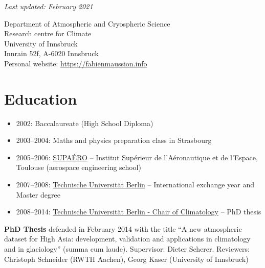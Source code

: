 \textit{Last updated: February 2021}

Department of Atmospheric and Cryospheric Science \\
Research centre for Climate \\
University of Innsbruck \\
Innrain 52f, A-6020 Innsbruck \\
Personal website: \href{https://fabienmaussion.info}{https://fabienmaussion.info}


\section*{Education}
\label{\detokenize{ch08/cv:education}}\begin{itemize}[nosep]
\item {} 
2002: Baccalaureate (High School Diploma)

\item {} 
2003--2004: Maths and physics preparation class in Strasbourg

\item {} 
2005--2006: \href{https://www.isae-supaero.fr/en/}{SUPAÉRO} -- Institut Supérieur de l’Aéronautique et de l’Espace, Toulouse (aerospace engineering school)

\item {} 
2007--2008: \href{https://www.tu.berlin/}{Technische Universität Berlin} -- International exchange year and Master degree

\item {} 
2008--2014: \href{https://www.klima.tu-berlin.de}{Technische Universität Berlin - Chair of Climatology} -- PhD thesis

\end{itemize}

\textbf{PhD Thesis} defended in February 2014 with the title “A new atmospheric dataset for High Asia: development,
validation and applications in climatology and in glaciology” (summa cum laude). 
Supervisor: Dieter Scherer. Reviewers: Christoph Schneider (RWTH Aachen), Georg Kaser (University of Innsbruck)


